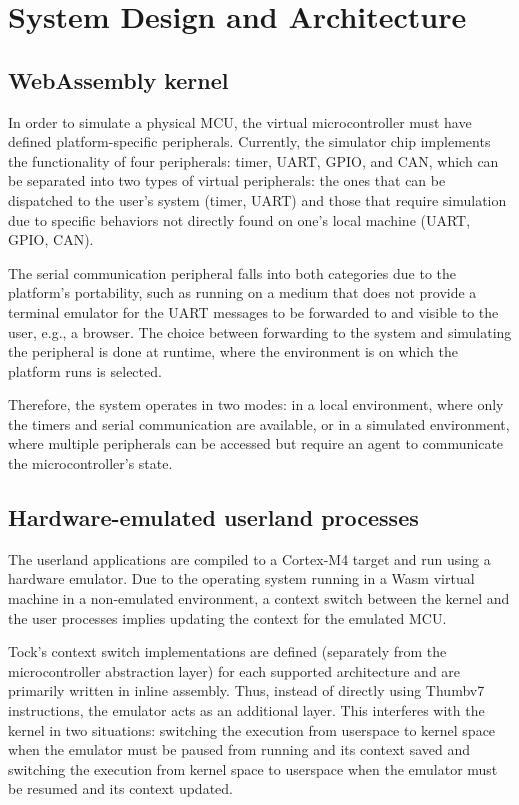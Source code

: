 \documentclass[12pt,a4paper]{report}
\begin{document}
\chapter{System Design and Architecture}

\section{WebAssembly kernel}

In order to simulate a physical MCU, the virtual microcontroller must have defined platform-specific peripherals. Currently, the simulator chip implements the functionality of four peripherals: timer, UART, GPIO, and CAN, which can be separated into two types of virtual peripherals:
the ones that can be dispatched to the user's system (timer, UART) and those that require simulation due to specific behaviors not directly found on one's local machine (UART, GPIO, CAN).

The serial communication peripheral falls into both categories due to the platform's portability, such as running on a medium that does not provide a terminal emulator for the UART messages to be forwarded to and visible to the user, e.g., a browser. The choice between forwarding to the system and simulating the peripheral is done at runtime, where the environment is on which the platform runs is selected.

Therefore, the system operates in two modes: in a local environment, where only the timers and serial communication are available, or in a simulated environment, where multiple peripherals can be accessed but require an agent to communicate the microcontroller's state.

\section{Hardware-emulated userland processes}

The userland applications are compiled to a Cortex-M4 target and run using a hardware emulator. Due to the operating system running in a Wasm virtual machine in a non-emulated environment, a context switch between the kernel and the user processes implies updating the context for the emulated MCU.

Tock's context switch implementations are defined (separately from the microcontroller abstraction layer) for each supported architecture and are primarily written in inline assembly. Thus, instead of directly using Thumbv7 instructions, the emulator acts as an additional layer. This interferes with the kernel in two situations: switching the execution from userspace to kernel space when the emulator must be paused from running and its context saved and switching the execution from kernel space to userspace when the emulator must be resumed and its context updated.
\end{document}
